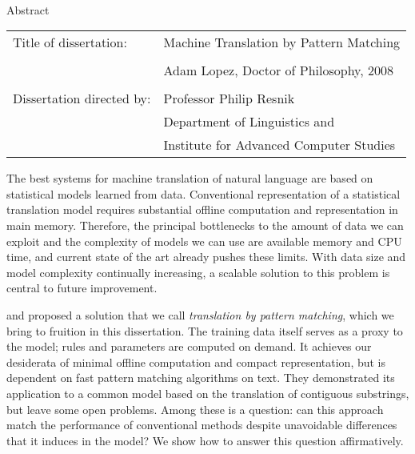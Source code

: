 
\hbox{\ }

\figpreamble
\small \normalsize

{\LARGE \begin{center}Abstract\end{center}} %

\vspace{3em} 

\hspace{-.15in}
\begin{tabular}{ll}
Title of dissertation:    & {\sc Machine Translation by Pattern Matching}\\
& \\
&                          {Adam Lopez, Doctor of Philosophy, 2008}\\ 
& \\
Dissertation directed by: & {Professor Philip Resnik} \\
&  				{Department of Linguistics and} \\
&  				{Institute for Advanced Computer Studies} \\
\end{tabular}
\figpostamble

\vspace{3em}

\large \normalsize
The best systems for machine translation of natural language
are based on statistical models learned from data.  Conventional
representation of a statistical translation model requires substantial
offline computation and representation in main memory.
Therefore, the principal bottlenecks to the amount of data we can exploit
and the complexity of models we can use are available memory and CPU time,
and current state of the art already pushes these limits.  With data size
and model complexity continually increasing, a scalable solution to this
problem is central to future improvement.

\citet{Callison-Burch:2005:acl} and \citet{Zhang:2005:eamt} proposed a solution
that we call {\em translation by pattern matching}, which we bring to fruition
in this dissertation.  The training data itself serves as a proxy to the
model; rules and parameters are computed on demand.  It achieves our
desiderata of minimal offline computation and compact representation, but is
dependent on fast pattern matching algorithms on text.  They demonstrated
its application to a common model based on the translation of contiguous
substrings, but leave some open problems.  Among these is a question: can
this approach match the performance of conventional methods despite
unavoidable differences that it induces in the model?  We show how to answer
this question affirmatively.

